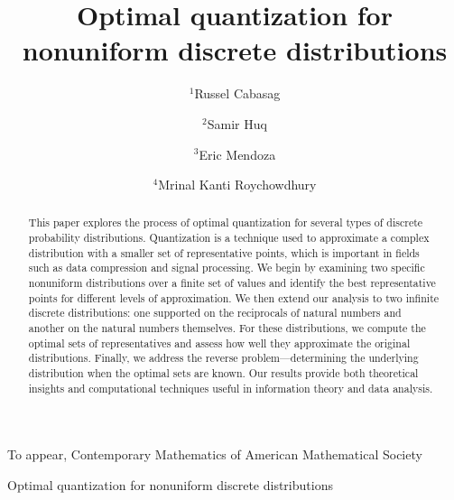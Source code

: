 \documentclass[12pt, reqno]{amsart}
\theoremstyle{plain}
\theoremstyle{definition}
\newcommand{\nd}{\noindent}
\begin{document}
\nd To appear, Contemporary Mathematics of American Mathematical Society
\title{Optimal quantization for nonuniform discrete distributions}


\address{School of Mathematical and Statistical Sciences\\
University of Texas Rio Grande Valley\\
1201 West University Drive\\
Edinburg, TX 78539-2999, USA.}


\author{$^1$Russel Cabasag}
 \author{$^2$Samir Huq}
 \author{$^3$Eric Mendoza}
  \author{$^4$Mrinal Kanti Roychowdhury}




\date{}
\maketitle

\pagestyle{myheadings}
{Optimal quantization for nonuniform discrete distributions}

\begin{abstract}
This paper explores the process of optimal quantization for several types of discrete probability distributions. Quantization is a technique used to approximate a complex distribution with a smaller set of representative points, which is important in fields such as data compression and signal processing. We begin by examining two specific nonuniform distributions over a finite set of values and identify the best representative points for different levels of approximation. We then extend our analysis to two infinite discrete distributions: one supported on the reciprocals of natural numbers and another on the natural numbers themselves. For these distributions, we compute the optimal sets of representatives and assess how well they approximate the original distributions. Finally, we address the reverse problem—determining the underlying distribution when the optimal sets are known. Our results provide both theoretical insights and computational techniques useful in information theory and data analysis.
\end{abstract}
\end{document}
